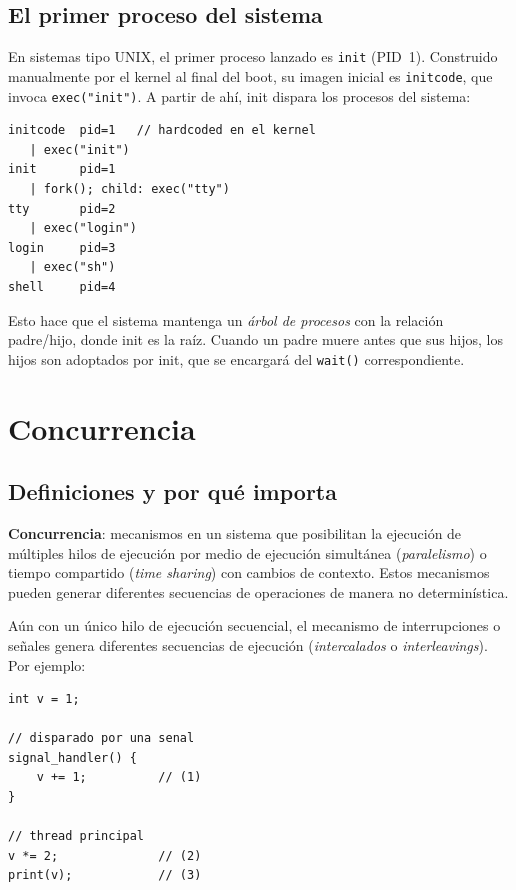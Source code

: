 \documentclass[11pt,a4paper]{article}
\begin{document}
\subsection{El primer proceso del sistema}

En sistemas tipo UNIX, el primer proceso lanzado es \texttt{init}
(PID~1). Construido manualmente por el kernel al final del boot, su
imagen inicial es \texttt{initcode}, que invoca \texttt{exec("init")}.
A partir de ahí, init dispara los procesos del sistema:

\begin{lstlisting}[style=textstyle]
initcode  pid=1   // hardcoded en el kernel
   | exec("init")
init      pid=1
   | fork(); child: exec("tty")
tty       pid=2
   | exec("login")
login     pid=3
   | exec("sh")
shell     pid=4
\end{lstlisting}

Esto hace que el sistema mantenga un \emph{árbol de procesos} con la
relación padre/hijo, donde init es la raíz. Cuando un padre muere
antes que sus hijos, los hijos son adoptados por init, que se
encargará del \texttt{wait()} correspondiente.

\section{Concurrencia}

\subsection{Definiciones y por qué importa}

\begin{definicion}
\textbf{Concurrencia}: mecanismos en un sistema que posibilitan la
ejecución de múltiples hilos de ejecución por medio de ejecución
simultánea (\emph{paralelismo}) o tiempo compartido (\emph{time
sharing}) con cambios de contexto. Estos mecanismos pueden generar
diferentes secuencias de operaciones de manera no determinística.
\end{definicion}

Aún con un único hilo de ejecución secuencial, el mecanismo de
interrupciones o señales genera diferentes secuencias de ejecución
(\emph{intercalados} o \emph{interleavings}). Por ejemplo:

\begin{lstlisting}[style=cstyle]
int v = 1;

// disparado por una senal
signal_handler() {
    v += 1;          // (1)
}

// thread principal
v *= 2;              // (2)
print(v);            // (3)
\end{lstlisting}
\end{document}
